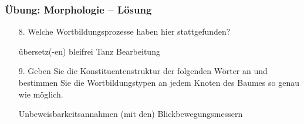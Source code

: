 
\begin{frame}
\frametitle{Übung: Morphologie -- Lösung}

\begin{itemize}
	\item[8.] Welche Wortbildungsprozesse haben hier stattgefunden?
	
	\settowidth {}
	
	\eal
	\ex übersetz(-en)  
	\ex bleifrei 
	\ex Tanz 
	\ex Bearbeitung 
	\zl
	
\end{itemize}

\end{frame}

\begin{frame}
	
\begin{itemize}
	
		\item[9.] Geben Sie die Konstituentenstruktur der folgenden Wörter an und bestimmen Sie die Wortbildungstypen an jedem Knoten des Baumes so genau wie möglich.
	
	\eal
	\ex \label{ex:Konstituente1}{Unbeweisbarkeitsannahmen}
	\ex \label{ex:Konstituente2}{(mit den) Blickbewegungsmessern}
	\zl

\end{itemize}

\end{frame}


